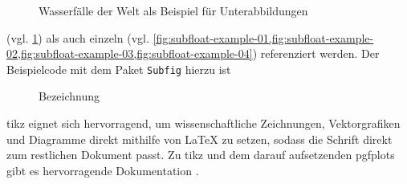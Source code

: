 \begin{figure}[tbp]
{} \qquad
{}
\caption{Wasserfälle der Welt als Beispiel für Unterabbildungen}
\label{fig:subfloat-example}
\end{figure}
(vgl. \cref{fig:subfloat-example}) als auch einzeln (vgl.
\cref{fig:subfloat-example-01,fig:subfloat-example-02,fig:subfloat-example-03,fig:subfloat-example-04})
referenziert werden. Der Beispielcode mit dem Paket \texttt{Subfig}
\parencite{Cochran2005} hierzu ist
\begin{latex}[caption={Unterabbildungen in LaTeX},label={lst:subfigures}]
\begin{figure}
\centering
{} \qquad
{}
\caption{Bezeichnung}
\label{fig:my-whole-figure}
\end{figure}
\end{latex}

\Gls{tikz} eignet sich hervorragend, um wissenschaftliche Zeichnungen, Vektorgrafiken
und Diagramme direkt mithilfe von LaTeX zu setzen, sodass die Schrift direkt zum
restlichen Dokument passt. Zu \gls{tikz} und dem darauf aufsetzenden \gls{pgfplots} gibt
es hervorragende Dokumentation \parencites{Tantau2013}{Feuersaenger2014}.



